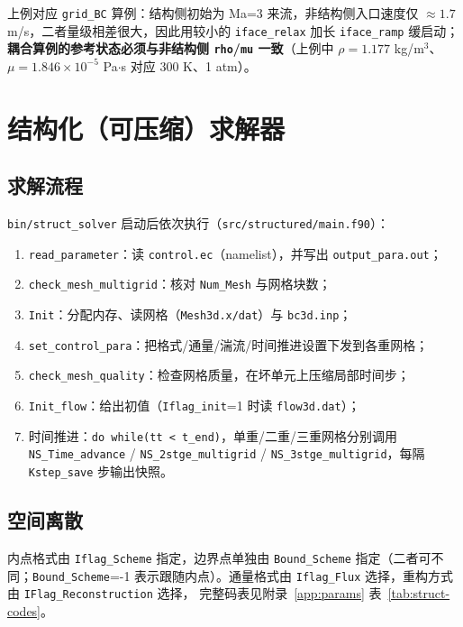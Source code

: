 \documentclass[11pt,a4paper]{ctexart}
\begin{document}
上例对应 \texttt{grid\_BC} 算例：结构侧初始为 Ma=3 来流，非结构侧入口速度仅
$\approx1.7$ m/s，二者量级相差很大，因此用较小的 \texttt{iface\_relax} 加长
\texttt{iface\_ramp} 缓启动；\textbf{耦合算例的参考状态必须与非结构侧
\texttt{rho}/\texttt{mu} 一致}（上例中 $\rho=1.177$ kg/m$^3$、
$\mu=1.846\times10^{-5}$ Pa$\cdot$s 对应 300 K、1 atm）。

\section{结构化（可压缩）求解器}\label{sec:struct}

\subsection{求解流程}

\texttt{bin/struct\_solver} 启动后依次执行（\texttt{src/structured/main.f90}）：

\begin{enumerate}\itemsep2pt
  \item \texttt{read\_parameter}：读 \texttt{control.ec}（namelist），并写出
        \texttt{output\_para.out}；
  \item \texttt{check\_mesh\_multigrid}：核对 \texttt{Num\_Mesh} 与网格块数；
  \item \texttt{Init}：分配内存、读网格（\texttt{Mesh3d.x/dat}）与 \texttt{bc3d.inp}；
  \item \texttt{set\_control\_para}：把格式/通量/湍流/时间推进设置下发到各重网格；
  \item \texttt{check\_mesh\_quality}：检查网格质量，在坏单元上压缩局部时间步；
  \item \texttt{Init\_flow}：给出初值（\texttt{Iflag\_init}=1 时读 \texttt{flow3d.dat}）；
  \item 时间推进：\texttt{do while(tt < t\_end)}，单重/二重/三重网格分别调用
        \texttt{NS\_Time\_advance} / \texttt{NS\_2stge\_multigrid} /
        \texttt{NS\_3stge\_multigrid}，每隔 \texttt{Kstep\_save} 步输出快照。
\end{enumerate}

\subsection{空间离散}

内点格式由 \texttt{Iflag\_Scheme} 指定，边界点单独由 \texttt{Bound\_Scheme}
指定（二者可不同；\texttt{Bound\_Scheme}=-1 表示跟随内点）。通量格式由
\texttt{Iflag\_Flux} 选择，重构方式由 \texttt{IFlag\_Reconstruction} 选择，
完整码表见附录~\ref{app:params} 表~\ref{tab:struct-codes}。
\end{document}
